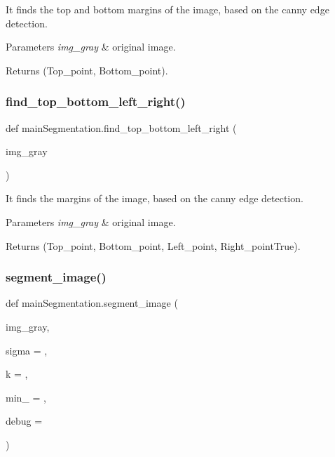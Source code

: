 It finds the top and bottom margins of the image, based on the canny edge detection. 


\begin{DoxyParams}{Parameters}
{\em img\+\_\+gray} & original image. \\
\hline
\end{DoxyParams}
\begin{DoxyReturn}{Returns}
(Top\+\_\+point, Bottom\+\_\+point). 
\end{DoxyReturn}
\mbox{\label{namespacemainSegmentation_a5be74b16e6526522552587323de4d0d0}} 
\subsubsection{\texorpdfstring{find\+\_\+top\+\_\+bottom\+\_\+left\+\_\+right()}{find\_top\_bottom\_left\_right()}}
{\footnotesize\ttfamily def main\+Segmentation.\+find\+\_\+top\+\_\+bottom\+\_\+left\+\_\+right (\begin{DoxyParamCaption}\item[{}]{img\+\_\+gray }\end{DoxyParamCaption})}



It finds the margins of the image, based on the canny edge detection. 


\begin{DoxyParams}{Parameters}
{\em img\+\_\+gray} & original image. \\
\hline
\end{DoxyParams}
\begin{DoxyReturn}{Returns}
(Top\+\_\+point, Bottom\+\_\+point, Left\+\_\+point, Right\+\_\+point\+True). 
\end{DoxyReturn}
\mbox{\label{namespacemainSegmentation_a909ab2c584028411a47d9d36dc5b484e}} 
\subsubsection{\texorpdfstring{segment\+\_\+image()}{segment\_image()}}
{\footnotesize\ttfamily def main\+Segmentation.\+segment\+\_\+image (\begin{DoxyParamCaption}\item[{}]{img\+\_\+gray,  }\item[{}]{sigma = {},  }\item[{}]{k = {},  }\item[{}]{min\+\_\+ = {},  }\item[{}]{debug = {} }\end{DoxyParamCaption})}



